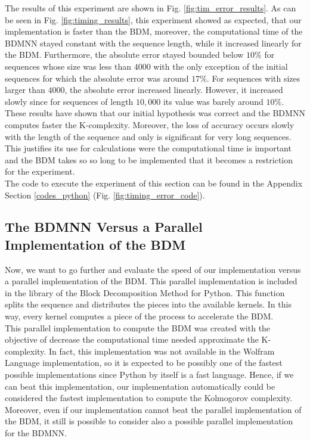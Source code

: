 The results of this experiment are shown in Fig. \ref{fig:tim_error_results}. As can be seen in Fig. \ref{fig:timing_results}, this experiment showed as expected, that our implementation is faster than the BDM, moreover, the computational time of the BDMNN stayed constant with the sequence length, while it increased linearly for the BDM. Furthermore, the absolute error stayed bounded below $10 \%$ for sequences whose size was less than $4000$ with the only exception of the initial sequences for which the absolute error was around $17 \%$. For sequences with sizes larger than $4000$, the absolute error increased linearly. However, it increased slowly since for sequences of length $10,000$ its value was barely around $10 \%$.\\

These results have shown that our initial hypothesis was correct and the BDMNN computes faster the K-complexity. Moreover, the loss of accuracy occurs slowly with the length of the sequence and only is significant for very long sequences. This justifies its use for calculations were the computational time is important and the BDM takes so so long to be implemented that it becomes a restriction for the experiment.\\

The code to execute the experiment of this section can be found in the Appendix Section \ref{codes_python} (Fig. \ref{fig:timing_error_code}).

\subsection{The BDMNN Versus a Parallel Implementation of the BDM}
Now, we want to go further and evaluate the speed of our implementation versus a parallel implementation of the BDM. This parallel implementation is included in the library of the Block Decomposition Method for Python. This function splits the sequence and distributes the pieces into the available kernels. In this way, every kernel computes a piece of the process to accelerate the BDM.\\

This parallel implementation to compute the BDM was created with the objective of decrease the computational time needed approximate the K-complexity. In fact, this implementation was not available in the Wolfram Language implementation, so it is expected to be possibly one of the fastest possible implementations since Python by itself is a fast language. Hence, if we can beat this implementation, our implementation automatically could be considered the fastest implementation to compute the Kolmogorov complexity. Moreover, even if our implementation cannot beat the parallel implementation of the BDM, it still is possible to consider also a possible parallel implementation for the BDMNN.\\ 

